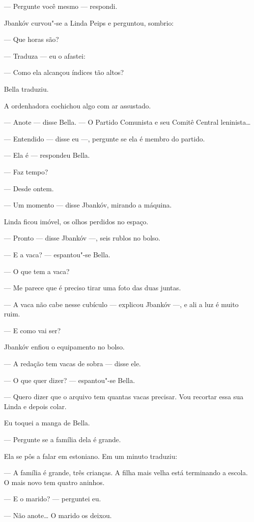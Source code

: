 --- Pergunte você mesmo --- respondi.

Jbankóv curvou"-se a Linda Peips e perguntou, sombrio:

--- Que horas são?

--- Traduza --- eu o afastei:

--- Como ela alcançou índices tão altos?

Bella traduziu.

A ordenhadora cochichou algo com ar assustado.

--- Anote --- disse Bella. --- O Partido Comunista
e seu Comitê Central leninista\ldots{}

--- Entendido --- disse eu ---, pergunte se ela é
membro do partido.

--- Ela é --- respondeu Bella.

--- Faz tempo?

--- Desde ontem.

--- Um momento --- disse Jbankóv, mirando a máquina.

Linda ficou imóvel, os olhos perdidos no espaço.

--- Pronto --- disse Jbankóv ---, seis rublos no
bolso.

--- E a vaca? --- espantou"-se Bella.

--- O que tem a vaca?

--- Me parece que é preciso tirar uma foto das duas juntas.

--- A vaca não cabe nesse cubículo --- explicou Jbankóv
---, e ali a luz é muito ruim.

--- E como vai ser?

Jbankóv enfiou o equipamento no bolso.

--- A redação tem vacas de sobra --- disse ele.

--- O que quer dizer? --- espantou"-se Bella.

--- Quero dizer que o arquivo tem quantas vacas precisar. Vou
recortar essa sua Linda e depois colar.

Eu toquei a manga de Bella.

--- Pergunte se a família dela é grande.

Ela se pôs a falar em estoniano. Em um minuto traduziu:

--- A família é grande, três crianças. A filha mais velha está
terminando a escola. O mais novo tem quatro aninhos.

--- E o marido? --- perguntei eu.

--- Não anote\ldots{} O marido os deixou.


